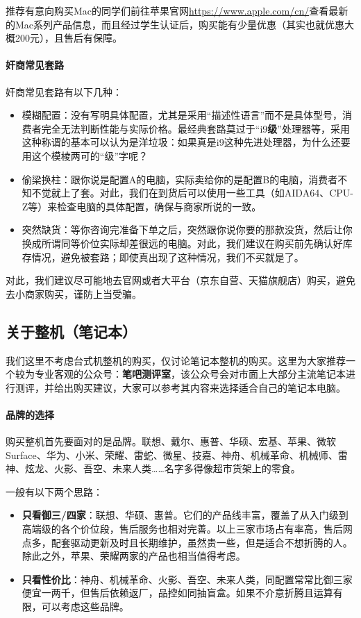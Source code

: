 推荐有意向购买Mac的同学们前往苹果官网\url{https://www.apple.com/cn/}查看最新的Mac系列产品信息，而且经过学生认证后，购买能有少量优惠（其实也就优惠大概200元），且售后有保障。


\paragraph{奸商常见套路}

奸商常见套路有以下几种：
\begin{itemize}
  \item 模糊配置：没有写明具体配置，尤其是采用“描述性语言”而不是具体型号，消费者完全无法判断性能与实际价格。最经典套路莫过于“i9\textbf{级}”处理器等，采用这种称谓的基本可以认为是洋垃圾：如果真是i9这种先进处理器，为什么还要用这个模棱两可的“级”字呢？
  \item 偷梁换柱：跟你说是配置A的电脑，实际卖给你的是配置B的电脑，消费者不知不觉就上了套。对此，我们在到货后可以使用一些工具（如AIDA64、CPU-Z等）来检查电脑的具体配置，确保与商家所说的一致。
  \item 突然缺货：等你咨询完准备下单之后，突然跟你说你要的那款没货，然后让你换成所谓同等价位实际却差很远的电脑。对此，我们建议在购买前先确认好库存情况，避免被套路；即使真出现了这种情况，我们不买就是了。
\end{itemize}
对此，我们建议尽可能地去官网或者大平台（京东自营、天猫旗舰店）购买，避免去小商家购买，谨防上当受骗。

\subsection{关于整机（笔记本）}

我们这里不考虑台式机整机的购买，仅讨论笔记本整机的购买。这里为大家推荐一个较为专业客观的公众号：\textbf{笔吧测评室}，该公众号会对市面上大部分主流笔记本进行测评，并给出购买建议，大家可以参考其内容来选择适合自己的笔记本电脑。

\paragraph{品牌的选择}

购买整机首先要面对的是品牌。联想、戴尔、惠普、华硕、宏基、苹果、微软 Surface、华为、小米、荣耀、雷蛇、微星、技嘉、神舟、机械革命、机械师、雷神、炫龙、火影、吾空、未来人类……名字多得像超市货架上的零食。

一般有以下两个思路：

\begin{itemize}
  \item \textbf{只看御三/四家}：联想、华硕、惠普。它们的产品线丰富，覆盖了从入门级到高端级的各个价位段，售后服务也相对完善。以上三家市场占有率高，售后网点多，配套驱动更新及时且长期维护，虽然贵一些，但是适合不想折腾的人。除此之外，苹果、荣耀两家的产品也相当值得考虑。
  \item \textbf{只看性价比}：神舟、机械革命、火影、吾空、未来人类，同配置常常比御三家便宜一两千，但售后依赖返厂，品控如同抽盲盒。如果不介意折腾且运算有限，可以考虑这些品牌。
\end{itemize}

